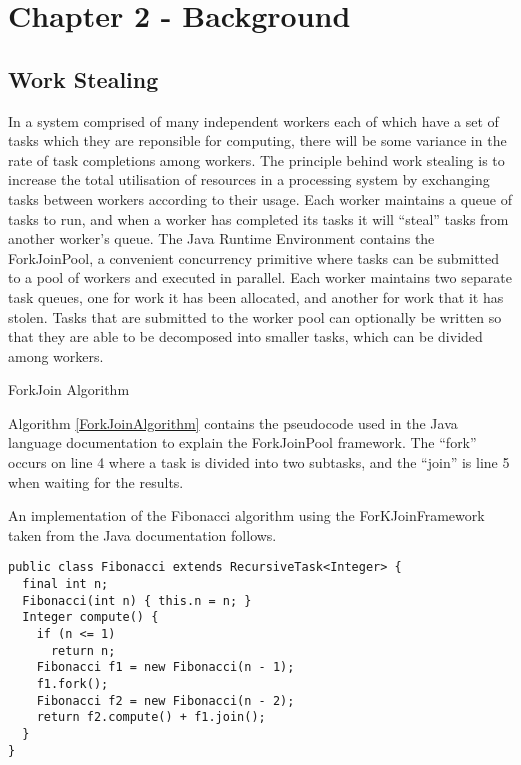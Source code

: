 \documentclass[12pt]{article}
\begin{document}
\newpage

\section{Chapter 2 - Background}

\subsection{Work Stealing}

In a system comprised of many independent workers each of which have a set of tasks which they are reponsible for computing, there will be some variance in the rate of task completions among workers.
\newline
\newline
The principle behind work stealing is to increase the total utilisation of resources in a processing system by exchanging tasks between workers according to their usage. Each worker maintains a queue of tasks to run, and when a worker has completed its tasks it will ``steal'' tasks from another worker's queue.
\newline
\newline
The Java Runtime Environment contains the ForkJoinPool\cite{javaThreads}, a convenient concurrency primitive where tasks can be submitted to a pool of workers and executed in parallel. Each worker maintains two separate task queues, one for work it has been allocated, and another for work that it has stolen. Tasks that are submitted to the worker pool can optionally be written so that they are able to be decomposed into smaller tasks, which can be divided among workers.
\newline

\IncMargin{1em}
\begin{algorithm}[H]
 \caption{ForkJoin Algorithm}
 \label{ForkJoinAlgorithm}
\end{algorithm}
\DecMargin{1em}
\medskip
Algorithm \ref{ForkJoinAlgorithm} contains the pseudocode used in the Java language documentation to explain the ForkJoinPool framework. The ``fork'' occurs on line 4 where a task is divided into two subtasks, and the ``join'' is line 5 when waiting for the results.

\newpage

An implementation of the Fibonacci algorithm using the ForKJoinFramework taken from the Java documentation follows.
\newline
\begin{lstlisting}
public class Fibonacci extends RecursiveTask<Integer> {
  final int n;
  Fibonacci(int n) { this.n = n; }
  Integer compute() {
    if (n <= 1)
      return n;
    Fibonacci f1 = new Fibonacci(n - 1);
    f1.fork();
    Fibonacci f2 = new Fibonacci(n - 2);
    return f2.compute() + f1.join();
  }
}
\end{lstlisting}
\end{document}
